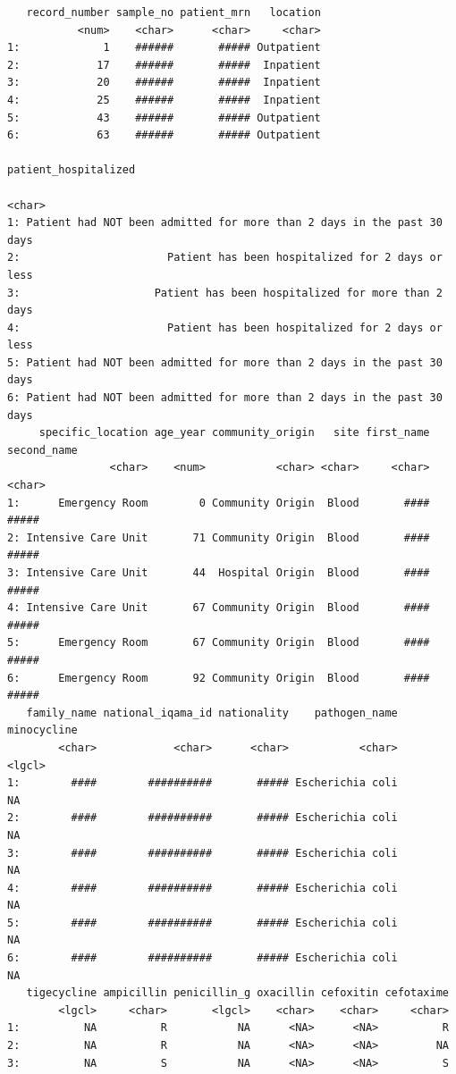 \documentclass[
  letterpaper,
  DIV=11,
  numbers=noendperiod]{scrreprt}
\begin{document}
\begin{verbatim}
   record_number sample_no patient_mrn   location
           <num>    <char>      <char>     <char>
1:             1    ######       ##### Outpatient
2:            17    ######       #####  Inpatient
3:            20    ######       #####  Inpatient
4:            25    ######       #####  Inpatient
5:            43    ######       ##### Outpatient
6:            63    ######       ##### Outpatient
                                                     patient_hospitalized
                                                                   <char>
1: Patient had NOT been admitted for more than 2 days in the past 30 days
2:                       Patient has been hospitalized for 2 days or less
3:                     Patient has been hospitalized for more than 2 days
4:                       Patient has been hospitalized for 2 days or less
5: Patient had NOT been admitted for more than 2 days in the past 30 days
6: Patient had NOT been admitted for more than 2 days in the past 30 days
     specific_location age_year community_origin   site first_name second_name
                <char>    <num>           <char> <char>     <char>      <char>
1:      Emergency Room        0 Community Origin  Blood       ####       #####
2: Intensive Care Unit       71 Community Origin  Blood       ####       #####
3: Intensive Care Unit       44  Hospital Origin  Blood       ####       #####
4: Intensive Care Unit       67 Community Origin  Blood       ####       #####
5:      Emergency Room       67 Community Origin  Blood       ####       #####
6:      Emergency Room       92 Community Origin  Blood       ####       #####
   family_name national_iqama_id nationality    pathogen_name minocycline
        <char>            <char>      <char>           <char>      <lgcl>
1:        ####        ##########       ##### Escherichia coli          NA
2:        ####        ##########       ##### Escherichia coli          NA
3:        ####        ##########       ##### Escherichia coli          NA
4:        ####        ##########       ##### Escherichia coli          NA
5:        ####        ##########       ##### Escherichia coli          NA
6:        ####        ##########       ##### Escherichia coli          NA
   tigecycline ampicillin penicillin_g oxacillin cefoxitin cefotaxime
        <lgcl>     <char>       <lgcl>    <char>    <char>     <char>
1:          NA          R           NA      <NA>      <NA>          R
2:          NA          R           NA      <NA>      <NA>         NA
3:          NA          S           NA      <NA>      <NA>          S

\end{verbatim}
\end{document}
